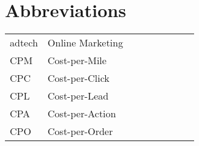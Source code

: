 \chapter*{Abbreviations}

\begin{flushleft}
\begin{tabular}{l p{0.8\linewidth}}
adtech   & Online Marketing\\
CPM   & Cost-per-Mile\\
CPC   & Cost-per-Click\\
CPL   & Cost-per-Lead\\
CPA   & Cost-per-Action\\
CPO   & Cost-per-Order\\
\end{tabular}
\end{flushleft}

